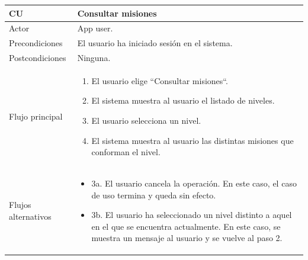 \documentclass[twoside]{report}
\newcommand\addrow[2]{#1 &#2\\ }
\newcommand\addheading[2]{#1 &#2\\ \hline}
\newcommand\tabularhead{\begin{tabular}{lp{0.7\textwidth}}
\hline
}
\newenvironment{usecase}{\tabularhead}
{\hline\end{tabular}}
\begin{document}
\vspace{0.5cm}

\begin{usecase}
  \addheading{\textbf{CU\arabic{usecase}}}{Consultar misiones} 
  \addrow{Actor}{App user.}
  \addrow{Precondiciones}{El usuario ha iniciado sesión en el sistema.}
  \addrow{Postcondiciones}{Ninguna.}
  \addrow{Flujo principal}{
  		\begin{enumerate}
  		\item El usuario elige “Consultar misiones“. %
  		\item El sistema muestra al usuario el listado de niveles. %
  		\item El usuario selecciona un nivel. %
  		\item El sistema muestra al usuario las distintas misiones que conforman el nivel. %
  		\end{enumerate}
  }
  \addrow{Flujos alternativos}{
  		\begin{itemize}
  		\item 3a. El usuario cancela la operación. En este caso, el caso de uso termina y queda sin efecto.
  		\item 3b. El usuario ha seleccionado un nivel distinto a aquel en el que se encuentra actualmente. En este caso, se muestra un mensaje al usuario y se vuelve al paso 2.
  		\end{itemize}
  }
\end{usecase}\\

\vspace{0.5cm}
\end{document}

